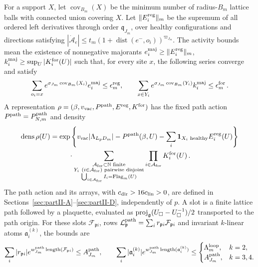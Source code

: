 \begin{definition}
For a support $X$, let $\operatorname{cov}_{B_m}(X)$ be the minimum number of radius-$B_m$ lattice balls with connected union covering $X$. Let $\|E_i^{\rm reg}\|_m$ be the supremum of all ordered left derivatives through order $\mathfrak q_{J_m}$, over healthy configurations and directions satisfying $|\dot{\mathcal A}_e|\le t_m(1+\operatorname{dist}(e^-,o_i))^{\varpi_{J_m}}$. The activity bounds mean the existence of nonnegative majorants $e_i^{\rm maj}\ge\|E_i^{\rm reg}\|_m$, $k_i^{\rm maj}\ge\sup_U|K_i^{\rm for}(U)|$ such that, for every site $x$, the following series converge and satisfy
\begin{equation}\label{eq:activity-bounds}
\sum_{o_i=x}e^{\sigma_{J_m}\operatorname{cov}_{B_m}(X_i)}e_i^{\rm maj}\le\epsilon_m^{\rm reg},\qquad
\sum_{x\in Y_i}e^{\sigma_{J_m}\operatorname{cov}_{B_m}(Y_i)}k_i^{\rm maj}\le\epsilon_m^{\rm for}\,.
\end{equation}
A representation $\rho=(\beta,v_{\rm vac},P^{\mathrm{path}},E^{\rm reg},K^{\rm for})$ has the fixed path action $P^{\mathrm{path}}=P^{\mathrm{path}}_{N,m}$ and density
\begin{multline}\label{eq:represented-density}
\operatorname{dens}\rho(U)=\exp\left\{v_{\rm vac}|\Lambda_{L_pD_m}|-P^{\mathrm{path}}(\beta,U)-\sum_i\mathbf1_{X_i\text{ healthy}}E_i^{\rm reg}(U)\right\}\\
{}\cdot\sum_{\substack{\mathcal A_{\rm for}\subset\mathbb{N}\text{ finite}\\ Y_i\ (i\in\mathcal A_{\rm for})\text{ pairwise disjoint}\\ \bigcup_{i\in\mathcal A_{\rm for}}I_i=\operatorname{Flag}_m(U)}}\prod_{i\in\mathcal A_{\rm for}}K_i^{\rm for}(U)\,.
\end{multline}
The path action and its arrays, with $c_{\rm dir}>16c_{\rm lin}>0$, are defined in Sections~\ref{sec:partII-A}--\ref{sec:partII-D}, independently of $p$. A slot is a finite lattice path followed by a plaquette, evaluated as $\operatorname{proj}_{\mathfrak{g}}(U_\square-U_\square^{-1})/2$ transported to the path origin. For these slots $\mathcal F_{\mathfrak p i}$, rows $\mathcal L_{\mathfrak p}^{\rm path}=\sum_i r_{\mathfrak p i}\mathcal F_{\mathfrak p i}$ and invariant $k$-linear atoms $\mathfrak a_i^{(k)}$, the bounds are
\begin{equation}\label{eq:path-bounds}
\sum_i|r_{\mathfrak p i}|e^{w_{J_m}^{\rm path}\operatorname{length}(\mathcal F_{\mathfrak p i})}\le A_{J_m}^{\rm path},\qquad
\sum_i|\mathfrak a_i^{(k)}|e^{w_{J_m}^{\rm path}\operatorname{length}(\mathfrak a_i^{(k)})}\le
\begin{cases}\Lambda_m^{\rm loop},&k=2,\\ A_{J_m}^{\rm path},&k=3,4.\end{cases}

\end{equation}
\end{definition}
